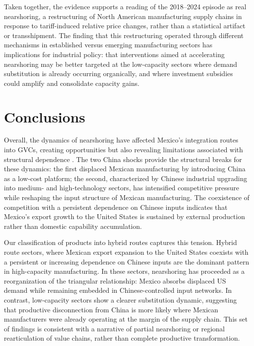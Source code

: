 \documentclass[11pt]{article}
\begin{document}
Taken together, the evidence supports a reading of the 2018--2024 episode as real nearshoring, a restructuring of North American manufacturing
supply chains in response to tariff-induced relative price changes,
rather than a statistical artifact or transshipment. The finding that this
restructuring operated through different mechanisms in
established versus emerging manufacturing sectors has implications for
industrial policy: that interventions aimed at accelerating nearshoring may be
better targeted at the low-capacity sectors where demand substitution is
already occurring organically, and where investment subsidies could amplify and consolidate
capacity gains.

\section{Conclusions}
Overall, the dynamics of nearshoring have affected Mexico's integration
routes into GVCs, creating opportunities but also revealing limitations
associated with structural dependence \citep{HernandezBenitez2023}. The two China shocks provide the structural breaks for these dynamics: the
first displaced Mexican manufacturing by introducing China as a low-cost
platform; the second, characterized by Chinese industrial upgrading into
medium- and high-technology sectors, has intensified competitive pressure
while reshaping the input structure of Mexican manufacturing.
The coexistence of competition with a persistent dependence on Chinese inputs indicates that Mexico's export growth to the United States is
sustained by external production rather than domestic capability
accumulation.

Our classification of products into hybrid routes captures this tension. Hybrid route sectors, where Mexican export expansion to the
United States coexists with a persistent or increasing dependence on
Chinese inputs are the dominant pattern in high-capacity manufacturing. In these sectors, nearshoring has proceeded as a reorganization of the
triangular relationship: Mexico absorbs displaced US demand while
remaining embedded in Chinese-controlled input networks. In contrast,
low-capacity sectors show a clearer substitution dynamic, suggesting that
productive disconnection from China is more likely where Mexican manufacturers were already operating at the margin of the supply chain.
This set of findings is consistent with a narrative of partial nearshoring
or regional rearticulation of value chains, rather than complete
productive transformation.
\end{document}
